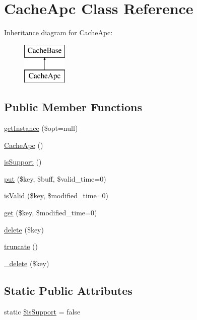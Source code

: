 \hypertarget{classCacheApc}{}\section{Cache\+Apc Class Reference}
\label{classCacheApc}
Inheritance diagram for Cache\+Apc\+:\begin{figure}[H]
\begin{center}
\leavevmode
\includegraphics[height=2.000000cm]{classCacheApc}
\end{center}
\end{figure}
\subsection*{Public Member Functions}
\begin{DoxyCompactItemize}
\item 
\hyperlink{classCacheApc_ab175f6bbdebb9ce327c019c3be313331}{get\+Instance} (\$opt=null)
\item 
\hyperlink{classCacheApc_ae75af46358f790955fce6c7fdb99ffdc}{Cache\+Apc} ()
\item 
\hyperlink{classCacheApc_abd38db973d6d7188606a726d7a5fcc40}{is\+Support} ()
\item 
\hyperlink{classCacheApc_abdfbacf78bd79a1339b0fd37d97f399e}{put} (\$key, \$buff, \$valid\+\_\+time=0)
\item 
\hyperlink{classCacheApc_ae915c4aded713867d7fab9b691ab5795}{is\+Valid} (\$key, \$modified\+\_\+time=0)
\item 
\hyperlink{classCacheApc_ae4b086e28a3b2820174641e964844ceb}{get} (\$key, \$modified\+\_\+time=0)
\item 
\hyperlink{classCacheApc_a694a318a017e38de1fa758f557dbcb80}{delete} (\$key)
\item 
\hyperlink{classCacheApc_ad32f48b59d64b4f71fc0c61744468584}{truncate} ()
\item 
\hyperlink{classCacheApc_a14d5f6b3e8743ea43ad3307816cec95d}{\+\_\+delete} (\$key)
\end{DoxyCompactItemize}
\subsection*{Static Public Attributes}
\begin{DoxyCompactItemize}
\item 
static \hyperlink{classCacheApc_a337478fa933fb622e28f28b3baee3433}{\$is\+Support} = false
\end{DoxyCompactItemize}
